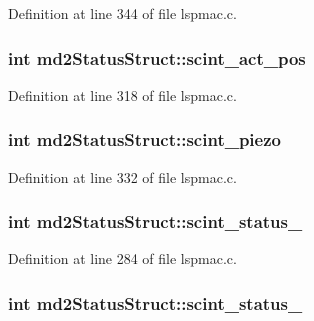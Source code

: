 Definition at line 344 of file lspmac.\-c.

\hypertarget{structmd2StatusStruct_a1c146fc792c4285eed5b2c446c214f98}{
\subsubsection[{scint\-\_\-act\-\_\-pos}]{\setlength{\rightskip}{0pt plus 5cm}int md2\-Status\-Struct\-::scint\-\_\-act\-\_\-pos}}\label{structmd2StatusStruct_a1c146fc792c4285eed5b2c446c214f98}


Definition at line 318 of file lspmac.\-c.

\hypertarget{structmd2StatusStruct_a031be48adfa016c637d6eae49054c435}{
\subsubsection[{scint\-\_\-piezo}]{\setlength{\rightskip}{0pt plus 5cm}int md2\-Status\-Struct\-::scint\-\_\-piezo}}\label{structmd2StatusStruct_a031be48adfa016c637d6eae49054c435}


Definition at line 332 of file lspmac.\-c.

\hypertarget{structmd2StatusStruct_a1723870357f428ac5c2758a2c9a475c7}{
\subsubsection[{scint\-\_\-status\-\_\-1}]{\setlength{\rightskip}{0pt plus 5cm}int md2\-Status\-Struct\-::scint\-\_\-status\-\_}}\label{structmd2StatusStruct_a1723870357f428ac5c2758a2c9a475c7}


Definition at line 284 of file lspmac.\-c.

\hypertarget{structmd2StatusStruct_a4e5bc72e2f4007370f1c29ea272c952f}{
\subsubsection[{scint\-\_\-status\-\_\-2}]{\setlength{\rightskip}{0pt plus 5cm}int md2\-Status\-Struct\-::scint\-\_\-status\-\_}}\label{structmd2StatusStruct_a4e5bc72e2f4007370f1c29ea272c952f}


